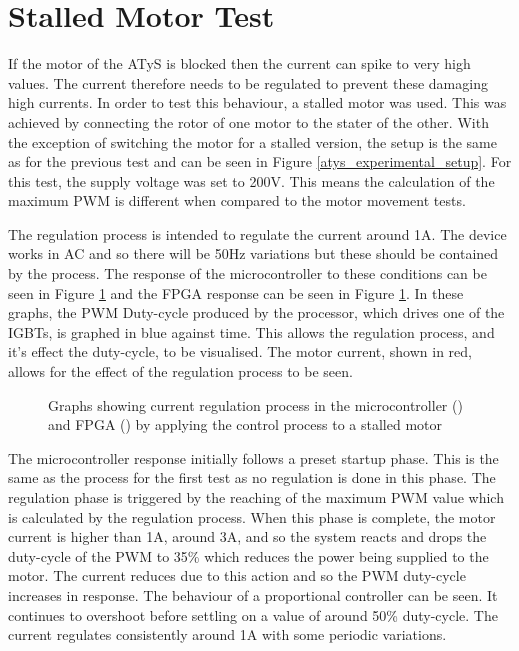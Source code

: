 \section{Stalled Motor Test}
\label{current-reg}
If the motor of the ATyS is blocked then the current can spike to very high values. The current therefore needs to be regulated to prevent these damaging high currents. In order to test this behaviour, a stalled motor was used. This was achieved by connecting the rotor of one motor to the stater of the other. With the exception of switching the motor for a stalled version, the setup is the same as for the previous test and can be seen in Figure \ref{atys_experimental_setup}. For this test, the supply voltage was set to 200V. This means the calculation of the maximum PWM is different when compared to the motor movement tests.

The regulation process is intended to regulate the current around 1A. The device works in AC and so there will be 50Hz variations but these should be contained by the process. The response of the microcontroller to these conditions can be seen in Figure \ref{stalled_motor_test} and the FPGA response can be seen in Figure \ref{stalled_motor_test}. In these graphs, the PWM Duty-cycle produced by the processor, which drives one of the IGBTs, is graphed in blue against time. This allows the regulation process, and it's effect the duty-cycle, to be visualised. The motor current, shown in red, allows for the effect of the regulation process to be seen.

\begin{figure}
\centering


\caption{Graphs showing current regulation process in the microcontroller () and FPGA () by applying the control process to a stalled motor}
\label{stalled_motor_test}
\end{figure}

The microcontroller response initially follows a preset startup phase. This is the same as the process for the first test as no regulation is done in this phase. The regulation phase is triggered by the reaching of the maximum PWM value which is calculated by the regulation process. When this phase is complete, the motor current is higher than 1A, around 3A, and so the system reacts and drops the duty-cycle of the PWM to 35\% which reduces the power being supplied to the motor. The current reduces due to this action and so the PWM duty-cycle increases in response. The behaviour of a proportional controller can be seen. It continues to overshoot before settling on a value of around 50\% duty-cycle. The current regulates consistently around 1A with some periodic variations.

